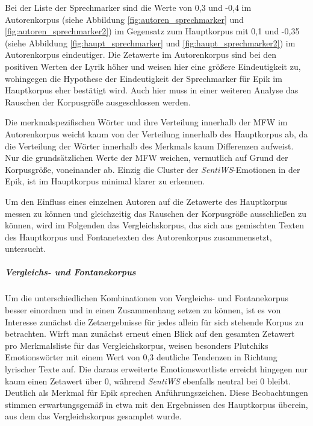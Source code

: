 \documentclass[a4paper,10p]{article}
\begin{document}
Bei der Liste der Sprechmarker sind die Werte von 0,3 und -0,4 im Autorenkorpus (siehe Abbildung \ref{fig:autoren_sprechmarker} und \ref{fig:autoren_sprechmarker2}) im Gegensatz zum Hauptkorpus mit 0,1 und -0,35 (siehe Abbildung \ref{fig:haupt_sprechmarker} und \ref{fig:haupt_sprechmarker2}) im Autorenkorpus eindeutiger. Die Zetawerte im Autorenkorpus sind bei den positiven Werten der Lyrik höher und weisen hier eine größere Eindeutigkeit zu, wohingegen die Hypothese der Eindeutigkeit der Sprechmarker für Epik im Hauptkorpus eher bestätigt wird. Auch hier muss in einer weiteren Analyse das Rauschen der Korpusgröße ausgeschlossen werden. \par 

Die merkmalspezifischen Wörter und ihre Verteilung innerhalb der MFW im Autorenkorpus weicht kaum von der Verteilung innerhalb des Hauptkorpus ab, da die Verteilung der Wörter innerhalb des Merkmals kaum Differenzen aufweist. Nur die grundsätzlichen Werte der MFW weichen, vermutlich auf Grund der Korpusgröße, voneinander ab. Einzig die Cluster der \emph{SentiWS}-Emotionen in der Epik, ist im Hauptkorpus minimal klarer zu erkennen. \par 

Um den Einfluss eines einzelnen Autoren auf die Zetawerte des Hauptkorpus messen zu können und gleichzeitig das Rauschen der Korpusgröße ausschließen zu können, wird im Folgenden das Vergleichskorpus, das sich aus gemischten Texten des Hauptkorpus und Fontanetexten des Autorenkorpus zusammensetzt, untersucht. 

\subparagraph{Vergleichs- und Fontanekorpus} \quad \par 

Um die unterschiedlichen Kombinationen von Ver\-gleichs- und Fontanekorpus besser einordnen und in einen Zusammenhang setzen zu können, ist es von Interesse zunächst die Zetaergebnisse für jedes allein für sich stehende Korpus zu betrachten. Wirft man zunächst erneut einen Blick auf den gesamten Zetawert pro Merkmalsliste für das Vergleichskorpus, weisen besonders Plutchiks Emotionswörter mit einem Wert von 0,3  deutliche Tendenzen in Richtung lyrischer Texte auf. Die daraus erweiterte Emotionswortliste erreicht hingegen nur kaum einen Zetawert über 0, während \textit{SentiWS} ebenfalls neutral bei 0 bleibt. Deutlich als Merkmal für Epik sprechen Anführungszeichen. Diese Beobachtungen stimmen erwartungsgemäß in etwa mit den Ergebnissen des Hauptkorpus überein, aus dem das Vergleichskorpus gesamplet wurde.
\end{document}
